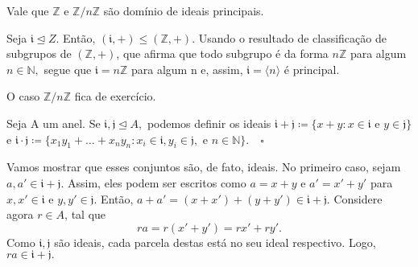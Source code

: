 \documentclass[AlgebraII/algebraII_notes.tex]{subfiles}
\begin{document}
\begin{lemma*}
	Vale que \(\mathbb{Z}\) e \(\mathbb{Z}/n \mathbb{Z}\) são domínio de ideais principais.
\end{lemma*}
\begin{proof*}
	Seja \(\mathfrak{i} \trianglelefteq{Z}.\) Então, \((\mathfrak{i}, +)\leq (\mathbb{Z}, +)\). Usando o resultado
	de classificação de subgrupos de \((\mathbb{Z}, +)\), que afirma que todo subgrupo é da forma \(n \mathbb{Z}\) para
	algum \(n\in \mathbb{N},\) segue que \(\mathfrak{i} = n \mathbb{Z}\) para algum n e, assim, \(\mathfrak{i} = \langle n \rangle\)
	é principal.

	O caso \(\mathbb{Z}/n \mathbb{Z}\) fica de exercício. \qedsymbol
\end{proof*}
\begin{def*}
	Seja A um anel. Se \(\mathfrak{i}, \mathfrak{j} \trianglelefteq{A},\) podemos definir os ideais \(\mathfrak{i} + \mathfrak{j}\coloneqq \{x+y:x\in \mathfrak{i}\text{ e } y\in \mathfrak{j}\}\)
	e \(\mathfrak{i} \cdot \mathfrak{j}\coloneqq \{x_{1}y_{1}+\dotsc+x_{n}y_{n}: x_{i}\in \mathfrak{i}, y_{i}\in \mathfrak{j}, \text{ e } n\in \mathbb{N}\}.\quad\square\)
\end{def*}
Vamos mostrar que esses conjuntos são, de fato, ideais. No primeiro caso, sejam \(a, a'\in \mathfrak{i} + \mathfrak{j}.\)
Assim, eles podem ser escritos como \(a = x + y\) e \(a'= x'+ y'\) para \(x, x'\in \mathfrak{i}\) e \(y, y'\in \mathfrak{j}.\)
Então, \(a + a' = (x + x') + (y + y')\in \mathfrak{i} + \mathfrak{j}.\) Considere agora \(r\in A\), tal que
\[
	ra = r(x'+y') = rx' + ry'.
\]
Como \(\mathfrak{i}, \mathfrak{j}\) são ideais, cada parcela destas está no seu ideal respectivo.
Logo, \(ra \in \mathfrak{i} + \mathfrak{j}.\)
\end{document}
